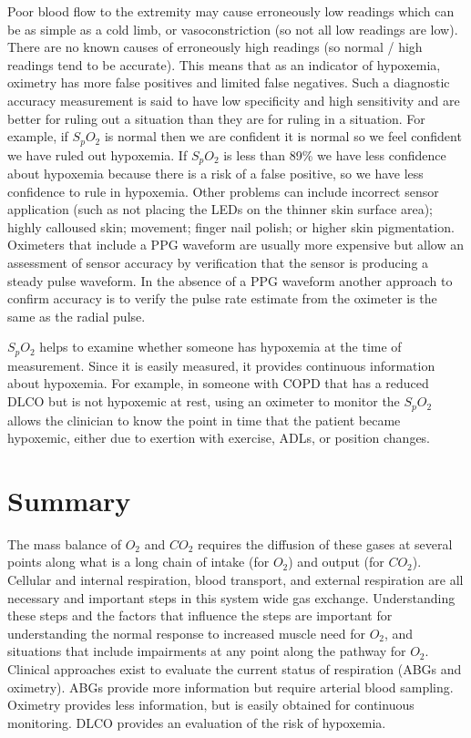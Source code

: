 Poor blood flow to the extremity may cause erroneously low readings which can be as simple as a cold limb, or vasoconstriction (so not all low readings are low). There are no known causes of erroneously high readings (so normal / high readings tend to be accurate). This means that as an indicator of hypoxemia, oximetry has more false positives and limited false negatives. Such a diagnostic accuracy measurement is said to have low specificity and high sensitivity and are better for ruling out a situation than they are for ruling in a situation. For example, if $S_pO_2$ is normal then we are confident it is normal so we feel confident we have ruled out hypoxemia. If $S_pO_2$ is less than 89\% we have less confidence about hypoxemia because there is a risk of a false positive, so we have less confidence to rule in hypoxemia. Other problems can include incorrect sensor application (such as not placing the LEDs on the thinner skin surface area); highly calloused skin; movement; finger nail polish; or higher skin pigmentation. Oximeters that include a PPG waveform are usually more expensive but allow an assessment of sensor accuracy by verification that the sensor is producing a steady pulse waveform. In the absence of a PPG waveform another approach to confirm accuracy is to verify the pulse rate estimate from the oximeter is the same as the radial pulse.

$S_pO_2$ helps to examine whether someone has hypoxemia at the time of measurement. Since it is easily measured, it provides continuous information about hypoxemia. For example, in someone with COPD that has a reduced DLCO but is not hypoxemic at rest, using an oximeter to monitor the $S_pO_2$ allows the clinician to know the point in time that the patient became hypoxemic, either due to exertion with exercise, ADLs, or position changes.

\section{Summary}

The mass balance of $O_2$ and $CO_2$ requires the diffusion of these gases at several points along what is a long chain of intake (for $O_2$) and output (for $CO_2$). Cellular and internal respiration, blood transport, and external respiration are all necessary and important steps in this system wide gas exchange. Understanding these steps and the factors that influence the steps are important for understanding the normal response to increased muscle need for $O_2$, and situations that include impairments at any point along the pathway for $O_2$. Clinical approaches exist to evaluate the current status of respiration (ABGs and oximetry). ABGs provide more information but require arterial blood sampling. Oximetry provides less information, but is easily obtained for continuous monitoring. DLCO provides an evaluation of the risk of hypoxemia. 


